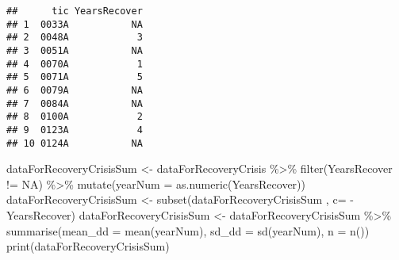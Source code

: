 \documentclass[
]{article}
\newenvironment{Shaded}{\begin{snugshade}}{\end{snugshade}}
\newcommand{\AttributeTok}[1]{\textcolor[rgb]{0.77,0.63,0.00}{#1}}
\newcommand{\DecValTok}[1]{\textcolor[rgb]{0.00,0.00,0.81}{#1}}
\newcommand{\FloatTok}[1]{\textcolor[rgb]{0.00,0.00,0.81}{#1}}
\newcommand{\FunctionTok}[1]{\textcolor[rgb]{0.00,0.00,0.00}{#1}}
\newcommand{\NormalTok}[1]{#1}
\newcommand{\OtherTok}[1]{\textcolor[rgb]{0.56,0.35,0.01}{#1}}
\newcommand{\SpecialCharTok}[1]{\textcolor[rgb]{0.00,0.00,0.00}{#1}}
\newcommand{\StringTok}[1]{\textcolor[rgb]{0.31,0.60,0.02}{#1}}
\begin{document}
\begin{Shaded}
\end{Shaded}

\begin{verbatim}
##      tic YearsRecover
## 1  0033A           NA
## 2  0048A            3
## 3  0051A           NA
## 4  0070A            1
## 5  0071A            5
## 6  0079A           NA
## 7  0084A           NA
## 8  0100A            2
## 9  0123A            4
## 10 0124A           NA
\end{verbatim}

\begin{Shaded}
\begin{Highlighting}[]
\NormalTok{dataForRecoveryCrisisSum }\OtherTok{\textless{}{-}}\NormalTok{ dataForRecoveryCrisis }\SpecialCharTok{\%\textgreater{}\%} \FunctionTok{filter}\NormalTok{(YearsRecover }\SpecialCharTok{!=} \StringTok{\textquotesingle{}NA\textquotesingle{}}\NormalTok{) }\SpecialCharTok{\%\textgreater{}\%} \FunctionTok{mutate}\NormalTok{(}\AttributeTok{yearNum =}  \FunctionTok{as.numeric}\NormalTok{(YearsRecover))}
\NormalTok{dataForRecoveryCrisisSum  }\OtherTok{\textless{}{-}} \FunctionTok{subset}\NormalTok{(dataForRecoveryCrisisSum , }\AttributeTok{c=} \SpecialCharTok{{-}}\NormalTok{ YearsRecover)}
\NormalTok{dataForRecoveryCrisisSum  }\OtherTok{\textless{}{-}}\NormalTok{ dataForRecoveryCrisisSum   }\SpecialCharTok{\%\textgreater{}\%} \FunctionTok{summarise}\NormalTok{(}\AttributeTok{mean\_dd =} \FunctionTok{mean}\NormalTok{(yearNum), }\AttributeTok{sd\_dd =} \FunctionTok{sd}\NormalTok{(yearNum), }\AttributeTok{n =} \FunctionTok{n}\NormalTok{())}
\FunctionTok{print}\NormalTok{(dataForRecoveryCrisisSum)}
\end{Highlighting}
\end{Shaded}
\end{document}
